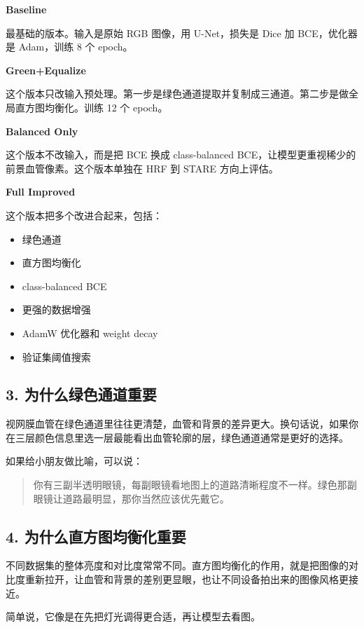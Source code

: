 \documentclass[12pt,a4paper]{ctexart}
\begin{document}
\textbf{Baseline}

最基础的版本。输入是原始 RGB 图像，用 U-Net，损失是 Dice 加 BCE，优化器是 Adam，训练 8 个 epoch。

\textbf{Green+Equalize}

这个版本只改输入预处理。第一步是绿色通道提取并复制成三通道。第二步是做全局直方图均衡化。训练 12 个 epoch。

\textbf{Balanced Only}

这个版本不改输入，而是把 BCE 换成 class-balanced BCE，让模型更重视稀少的前景血管像素。这个版本单独在 HRF 到 STARE 方向上评估。

\textbf{Full Improved}

这个版本把多个改进合起来，包括：

\begin{itemize}[leftmargin=1.6em]
  \item 绿色通道
  \item 直方图均衡化
  \item class-balanced BCE
  \item 更强的数据增强
  \item AdamW 优化器和 weight decay
  \item 验证集阈值搜索
\end{itemize}

\subsection*{3. 为什么绿色通道重要}

视网膜血管在绿色通道里往往更清楚，血管和背景的差异更大。换句话说，如果你在三层颜色信息里选一层最能看出血管轮廓的层，绿色通道通常是更好的选择。

如果给小朋友做比喻，可以说：

\begin{quote}
你有三副半透明眼镜，每副眼镜看地图上的道路清晰程度不一样。绿色那副眼镜让道路最明显，那你当然应该优先戴它。
\end{quote}

\subsection*{4. 为什么直方图均衡化重要}

不同数据集的整体亮度和对比度常常不同。直方图均衡化的作用，就是把图像的对比度重新拉开，让血管和背景的差别更显眼，也让不同设备拍出来的图像风格更接近。

简单说，它像是在先把灯光调得更合适，再让模型去看图。
\end{document}
